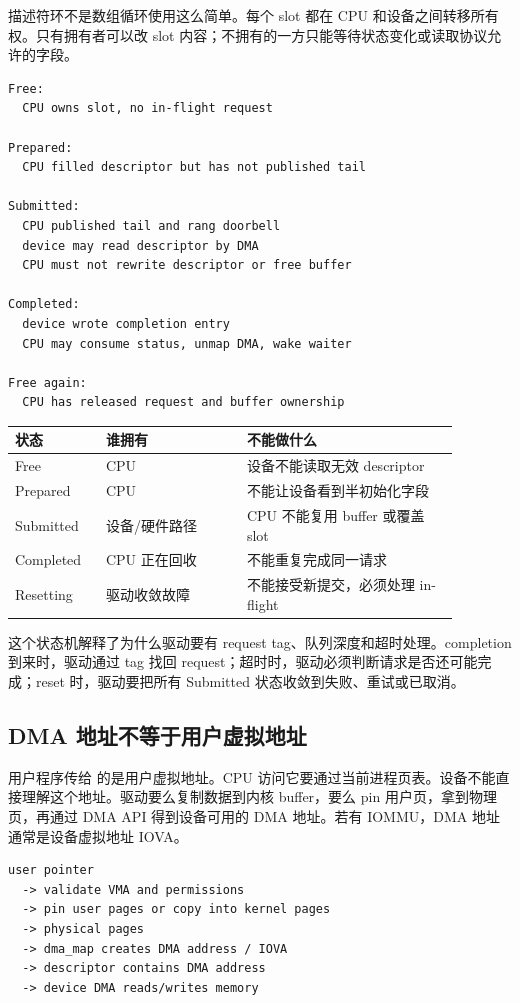 描述符环不是数组循环使用这么简单。每个 slot 都在 CPU 和设备之间转移所有权。只有拥有者可以改 slot 内容；不拥有的一方只能等待状态变化或读取协议允许的字段。

\begin{lstlisting}
Free:
  CPU owns slot, no in-flight request

Prepared:
  CPU filled descriptor but has not published tail

Submitted:
  CPU published tail and rang doorbell
  device may read descriptor by DMA
  CPU must not rewrite descriptor or free buffer

Completed:
  device wrote completion entry
  CPU may consume status, unmap DMA, wake waiter

Free again:
  CPU has released request and buffer ownership
\end{lstlisting}

\begin{longtable}{p{0.18\linewidth}p{0.28\linewidth}p{0.42\linewidth}}
\toprule
状态 & 谁拥有 & 不能做什么 \\
\midrule
Free & CPU & 设备不能读取无效 descriptor \\
Prepared & CPU & 不能让设备看到半初始化字段 \\
Submitted & 设备/硬件路径 & CPU 不能复用 buffer 或覆盖 slot \\
Completed & CPU 正在回收 & 不能重复完成同一请求 \\
Resetting & 驱动收敛故障 & 不能接受新提交，必须处理 in-flight \\
\bottomrule
\end{longtable}

这个状态机解释了为什么驱动要有 request tag、队列深度和超时处理。completion 到来时，驱动通过 tag 找回 request；超时时，驱动必须判断请求是否还可能完成；reset 时，驱动要把所有 Submitted 状态收敛到失败、重试或已取消。

\subsection{DMA 地址不等于用户虚拟地址}

用户程序传给  的是用户虚拟地址。CPU 访问它要通过当前进程页表。设备不能直接理解这个地址。驱动要么复制数据到内核 buffer，要么 pin 用户页，拿到物理页，再通过 DMA API 得到设备可用的 DMA 地址。若有 IOMMU，DMA 地址通常是设备虚拟地址 IOVA。

\begin{lstlisting}
user pointer
  -> validate VMA and permissions
  -> pin user pages or copy into kernel pages
  -> physical pages
  -> dma_map creates DMA address / IOVA
  -> descriptor contains DMA address
  -> device DMA reads/writes memory
\end{lstlisting}

